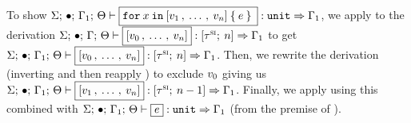 \begin{preservation}
{    To show $\oxtypjudge{\oxglobalctx}{\oxemptyctx}{\oxkontctx}{\oxvarctx_1}{
      \oxfor{\oxid}{\oxarr{\oxvalue_1 \oxdotsc \oxvalue_n}}{\oxexpr}
    }{\oxtunit}{\oxvarctx_1}$, we apply  to the
    derivation $\oxtypjudge{\oxglobalctx}{\oxemptyctx}{\oxkontctx}{\oxvarctx}
    {\oxarr{\oxvalue_0 \oxdotsc
        \oxvalue_n}}{\oxtarr{\oxsitype}{\oxnum}}{\oxvarctx_1}$ to get
    $\oxtypjudge{\oxglobalctx}{\oxemptyctx}{\oxkontctx}{\oxvarctx_1} {\oxarr{\oxvalue_0
        \oxdotsc \oxvalue_n}}{\oxtarr{\oxsitype}{\oxnum}}{\oxvarctx_1}$. Then,
    we rewrite the derivation (inverting and then reapply ) to
    exclude $v_0$ giving us
    $\oxtypjudge{\oxglobalctx}{\oxemptyctx}{\oxkontctx}{\oxvarctx_1} {\oxarr{\oxvalue_1
        \oxdotsc \oxvalue_n}}{\oxtarr{\oxsitype}{\oxnum - 1}}{\oxvarctx_1}$.
    Finally, we apply  using this combined with
    $\oxtypjudge{\oxglobalctx}{\oxemptyctx}{\oxkontctx}{\oxvarctx_1}
    {\oxexpr}{\oxtunit}{\oxvarctx_1}$ (from the premise of ).
  }


\end{preservation}


\begin{preservation}




\end{preservation}

